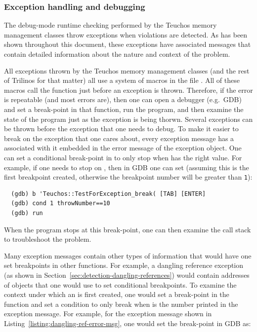 \documentclass[pdf,ps2pdf,11pt]{SANDreport}
\begin{document}
%
{}\subsubsection{Exception handling and debugging}
\label{sec:except-handling-debugging}
%

The debug-mode runtime checking performed by the Teuchos memory management classes throw exceptions when violations are detected.  As has been shown throughout this document, these exceptions have associated messages that contain detailed information about the nature and context of the problem.

All exceptions thrown by the Teuchos memory management classes (and the rest of Trilinos for that matter) all use a system of macros in the file {}.  All of these macros call the function {} just before an exception is thrown.  Therefore, if the error is repeatable (and most errors are), then one can open a debugger (e.g.\ GDB) and set a break-point in that function, run the program, and then examine the state of the program just as the exception is being thorwn.  Several exceptions can be thrown before the exception that one needs to debug. To make it easier to break on the exception that one cares about, every exception message has a {} associated with it embedded in the error message of the exception object.  One can set a conditional break-point in {} to only stop when {} has the right value.  For example, if one needs to stop on {}, then in GDB one can set (assuming this is the first breakpoint created, otherwise the breakpoint number will be greater than \texttt{1}):

{\small\begin{verbatim}
  (gdb) b 'Teuchos::TestForException_break( [TAB] [ENTER]
  (gdb) cond 1 throwNumber==10
  (gdb) run
\end{verbatim}}

When the program stops at this break-point, one can then examine the
call stack to troubleshoot the problem.

Many exception messages contain other types of information that would
have one set breakpoints in other functions.  For example, a dangling
reference exception (as shown in
Section~\ref{sec:detection-dangling-references}) would contain
addresses of objects that one would use to set conditional
breakpoints.  To examine the context under which an {} is
first created, one would set a break-point in the function
{} and set a condition
to only break when {} is the number printed in
the exception message.  For example, for the exception message shown
in Listing~\ref{listing:dangling-ref-error-msg}, one would set the
break-point in GDB as:
\end{document}

